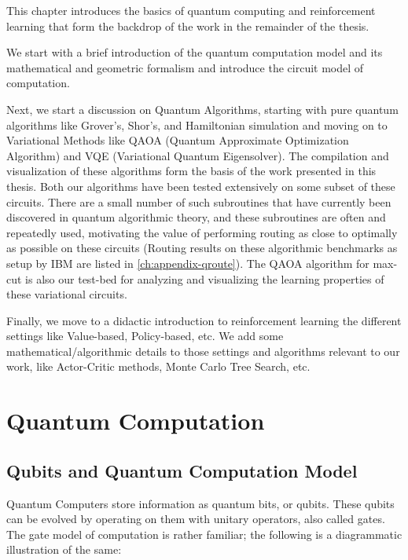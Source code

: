 This chapter introduces the basics of quantum computing and reinforcement learning that form the backdrop of the work in the remainder of the thesis.

We start with a brief introduction of the quantum computation model and its mathematical and geometric formalism and introduce the circuit model of computation. 

Next, we start a discussion on Quantum Algorithms, starting with pure quantum algorithms like Grover's, Shor's, and Hamiltonian simulation and moving on to Variational Methods like QAOA (Quantum Approximate Optimization Algorithm) and VQE (Variational Quantum Eigensolver). The compilation and visualization of these algorithms form the basis of the work presented in this thesis. Both our algorithms have been tested extensively on some subset of these circuits. There are a small number of such subroutines that have currently been discovered in quantum algorithmic theory, and these subroutines are often and repeatedly used, motivating the value of performing routing as close to optimally as possible on these circuits (Routing results on these algorithmic benchmarks as setup by IBM are listed in \ref{ch:appendix-qroute}). The QAOA algorithm for max-cut is also our test-bed for analyzing and visualizing the learning properties of these variational circuits.

Finally, we move to a didactic introduction to reinforcement learning the different settings like Value-based, Policy-based, etc. We add some mathematical/algorithmic details to those settings and algorithms relevant to our work, like Actor-Critic methods, Monte Carlo Tree Search, etc.

\section{Quantum Computation}


\subsection{Qubits and Quantum Computation Model}

Quantum Computers store information as quantum bits, or qubits. These qubits can be evolved by operating on them with unitary operators, also called gates. The gate model of computation is rather familiar; the following is a diagrammatic illustration of the same:

